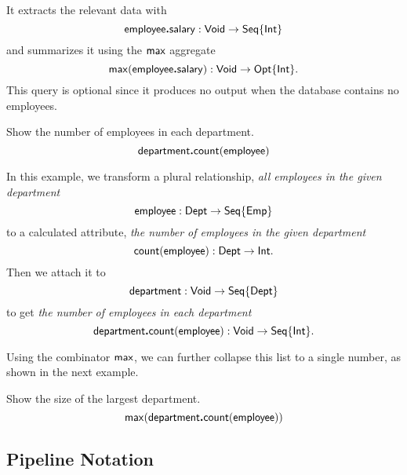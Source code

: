 It extracts the relevant data with
\begin{equation*}
    \mathsf{employee}\boldsymbol{.}\mathsf{salary} : \mathsf{Void} \to \mathsf{Seq}{\left\{\mathsf{Int}\right\}}
\end{equation*}
and summarizes it using the $\mathsf{max}$ aggregate
\begin{equation*}
    \mathsf{max}(\mathsf{employee}\boldsymbol{.}\mathsf{salary}) : \mathsf{Void} \to \mathsf{Opt}{\left\{\mathsf{Int}\right\}}.
\end{equation*}
This query is optional since it produces no output when the database contains
no employees.

\begin{demo}
    \label{ex:department-count-employee}
    Show the number of employees in each department.
    \begin{equation*}
        \mathsf{department}\boldsymbol{.}\mathsf{count}(\mathsf{employee})
    \end{equation*}
\end{demo}

In this example, we transform a plural relationship, \emph{all employees in the
given department}
\begin{equation*}
    \mathsf{employee} : \mathsf{Dept} \to \mathsf{Seq}{\left\{\mathsf{Emp}\right\}}
\end{equation*}
to a calculated attribute, \emph{the number of employees in the given
department}
\begin{equation*}
    \mathsf{count}(\mathsf{employee}) : \mathsf{Dept} \to \mathsf{Int}.
\end{equation*}
Then we attach it to
\begin{equation*}
    \mathsf{department} : \mathsf{Void} \to \mathsf{Seq}{\left\{\mathsf{Dept}\right\}}
\end{equation*}
to get \emph{the number of employees in each department}
\begin{equation*}
    \mathsf{department}\boldsymbol{.}\mathsf{count}(\mathsf{employee}) : \mathsf{Void} \to \mathsf{Seq}{\left\{\mathsf{Int}\right\}}.
\end{equation*}

Using the combinator $\mathsf{max}$, we can further collapse this list to a single
number, as shown in the next example.

\begin{demo}
    \label{ex:max-department-count-employee}
    Show the size of the largest department.
    \begin{equation*}
        \mathsf{max}(\mathsf{department}\boldsymbol{.}\mathsf{count}(\mathsf{employee}))
    \end{equation*}
\end{demo}

\subsection*{Pipeline Notation}

